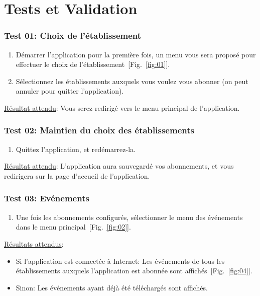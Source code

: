 \chapter{Tests et Validation}
  
  \subsection*{Test 01: Choix de l'établissement}
    \begin{enumerate}
    \item Démarrer l'application pour la première fois, un menu vous sera proposé pour effectuer le choix de l'établissement~[Fig.~\ref{fig:01}].
    \item Sélectionnez les établissements auxquels vous voulez vous abonner (on peut annuler pour quitter l'application).
    \end{enumerate}

    \underline{Résultat attendu}: Vous serez redirigé vers le menu principal de l'application.

  \subsection*{Test 02: Maintien du choix des établissements}
    \begin{enumerate}
    \item Quittez l'application, et redémarrez-la.
    \end{enumerate}

    \underline{Résultat attendu}: L'application aura sauvegardé vos abonnements, et vous redirigera sur la page d'accueil de l'application.

  \subsection*{Test 03: Evénements}
    \begin{enumerate}
    \item Une fois les abonnements configurés, sélectionner le menu des événements dans le menu principal~[Fig.~\ref{fig:02}].
    \end{enumerate}

    \underline{Résultats attendus}:
    \begin{itemize}
    \item Si l'application est connectée à Internet: Les événements de tous les établissements auxquels l'application est abonnée sont affichés~[Fig.~\ref{fig:04}].
    \item Sinon: Les événements ayant déjà été téléchargés sont affichés.
    \end{itemize}

